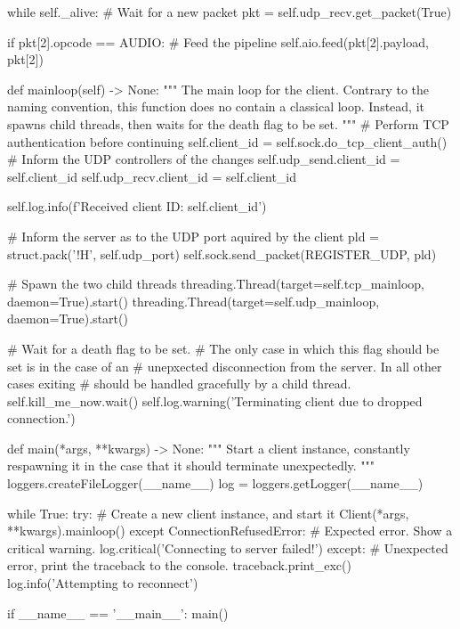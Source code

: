 \begin{pythoncode}
        while self._alive:
            # Wait for a new packet
            pkt = self.udp_recv.get_packet(True)

            if pkt[2].opcode == AUDIO:
                # Feed the pipeline
                self.aio.feed(pkt[2].payload, pkt[2])

    def mainloop(self) -> None:
        """
        The main loop for the client.
        Contrary to the naming convention, this function does no contain a
        classical loop. Instead, it spawns child threads, then waits for the
        death flag to be set.
        """
        # Perform TCP authentication before continuing
        self.client_id = self.sock.do_tcp_client_auth()
        # Inform the UDP controllers of the changes
        self.udp_send.client_id = self.client_id
        self.udp_recv.client_id = self.client_id

        self.log.info(f'Received client ID: {self.client_id}')

        # Inform the server as to the UDP port aquired by the client
        pld = struct.pack('!H', self.udp_port)
        self.sock.send_packet(REGISTER_UDP, pld)

        # Spawn the two child threads
        threading.Thread(target=self.tcp_mainloop, daemon=True).start()
        threading.Thread(target=self.udp_mainloop, daemon=True).start()

        # Wait for a death flag to be set.
        # The only case in which this flag should be set is in the case of an
        # unepxected disconnection from the server. In all other cases exiting
        # should be handled gracefully by a child thread.
        self.kill_me_now.wait()
        self.log.warning('Terminating client due to dropped connection.')


def main(*args, **kwargs) -> None:
    """
    Start a client instance, constantly respawning it in the case that it
    should terminate unexpectedly.
    """
    loggers.createFileLogger(__name__)
    log = loggers.getLogger(__name__)

    while True:
        try:
            # Create a new client instance, and start it
            Client(*args, **kwargs).mainloop()
        except ConnectionRefusedError:
            # Expected error. Show a critical warning.
            log.critical('Connecting to server failed!')
        except:
            # Unexpected error, print the traceback to the console.
            traceback.print_exc()
        log.info('Attempting to reconnect')


if __name__ == '__main__':
    main()
\end{pythoncode}
